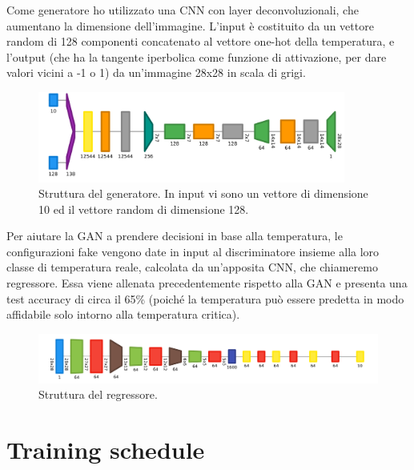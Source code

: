 \documentclass[Lau, noexaminfo, oneside]{sapthesis} %
\begin{document}
Come generatore ho utilizzato una CNN con layer deconvoluzionali, che aumentano la dimensione dell'immagine. L'input è costituito da un vettore random di 128 componenti concatenato al vettore one-hot della temperatura, e l'output (che ha la tangente iperbolica come funzione di attivazione, per dare valori vicini a -1 o 1) da un'immagine 28x28 in scala di grigi.
\begin{figure}[H]
\includegraphics[width=0.9\textwidth]{gen.png}
\centering
\caption{Struttura del generatore. In input vi sono un vettore di dimensione 10 ed il vettore random di dimensione 128.}
\end{figure}
Per aiutare la GAN a prendere decisioni in base alla temperatura, le configurazioni fake vengono date in input al discriminatore insieme alla loro classe di temperatura reale, calcolata da un'apposita CNN, che chiameremo regressore. Essa viene allenata precedentemente rispetto alla GAN e presenta una test accuracy di circa il 65\% (poiché la temperatura può essere predetta in modo affidabile solo intorno alla temperatura critica).
\begin{figure}[H]
\includegraphics[width=\textwidth]{reg.png}
\centering
\caption{Struttura del regressore.}
\end{figure}
\section{Training schedule}
\end{document}
